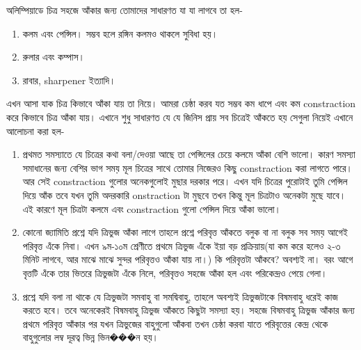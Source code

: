 \documentclass[a4paper,11pt]{article}
\begin{document}
অলিম্পিয়াডে চিত্র সহজে আঁকার জন্য তোমাদের সাধারণত যা যা লাগবে তা হল- 
\begin{enumerate}
	\item কলম এবং পেন্সিল। সম্ভব হলে রঙ্গিন কলমও থাকলে সুবিধা হয়।
	\item রুলার এবং কম্পাস।
	\item রাবার, sharpener ইত্যাদি।
\end{enumerate}
এখন আসা যাক চিত্র কিভাবে আঁকা যায় তা নিয়ে। আমরা চেষ্ঠা করব যত সম্ভব কম ধাপে এবং কম constraction করে কিভাবে চিত্র আঁকা যায়। এখানে শুধু সাধারণত যে যে জিনিস প্রায় সব চিত্রেই আঁকতে হয় সেগুলা নিয়েই এখানে আলোচনা করা হল-  
\begin{enumerate}
	\item প্রথমত সমস্যাতে যে চিত্রের কথা বলা/দেওয়া আছে তা পেন্সিলের চেয়ে কলমে আঁকা বেশি ভালো। কারণ সমস্যা সমাধানের জন্য বেশির ভাগ সময় মূল চিত্রের সাথে তোমার নিজেরও কিছু constraction করা লাগতে পারে। আর সেই constraction গুলোর অনেকগুলোই মুছার দরকার পরে। এখন যদি চিত্রের পুরোটাই তুমি পেন্সিল দিয়ে আঁক তবে যখন তুমি অদরকারি onstraction টা মুছবে তখন কিন্তু মূল চিত্রটাও অনেকটা মুছে যাবে। এই কারণে মূল চিত্রটা কলমে এবং constraction গুলো পেন্সিল দিয়ে আঁকা ভালো।
	\item কোনো জ্যামিতি প্রশ্নে যদি ত্রিভুজ আঁকা লাগে তাহলে প্রশ্নে পরিবৃত্ত আঁকতে বলুক বা না বলুক সব সময় আগেই পরিবৃত্ত এঁকে নিবা। এখন ৯ম-১০ম শ্রেণীতে প্রথমে ত্রিভুজ এঁকে ইয়া বড় প্রক্রিয়ায়(যা কম করে হলেও ২-৩ মিনিট লাগবে, আর মাঝে মাঝে সুন্দর পরিবৃত্তও আঁকা যায় না।) কি পরিবৃত্তটা আঁকবে? অবশ্যই না। বরং আগে বৃত্তটি এঁকে তার ভিতরে ত্রিভুজটা এঁকে নিলে, পরিবৃত্তও সহজে আঁকা হল এবং পরিকেন্দ্রও পেয়ে গেলা।
	\item প্রশ্নে যদি বলা না থাকে যে ত্রিভুজটা সমবাহু বা সমদ্বিবাহু, তাহলে অবশ্যই ত্রিভুজটাকে বিষমবাহু ধরেই কাজ করতে হবে। তবে অনেকেরই বিষমবাহু ত্রিভুজ আঁকতে কিছুটা সমস্যা হয়। সহজে বিষমবাহু ত্রিভুজ আঁকার জন্য প্রথমে পরিবৃত্ত আঁকার পর যখন ত্রিভুজের বাহুগুলো আঁকবা তখন চেষ্ঠা করবা যাতে পরিবৃত্তের কেন্দ্র থেকে বাহুগুলোর লম্ব দূরত্ব ভিন্ন ভিন���ন হয়।
	      \begin{center}
\end{center}
\end{enumerate}
\end{document}
